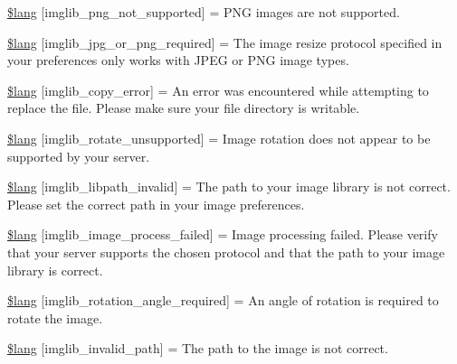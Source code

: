 \begin{DoxyCompactItemize}
\hyperlink{_admin_2system_2language_2english_2imglib__lang_8php_a0b7ea2e2fbd03eb72fe9d969adb643dd}{\$lang} \mbox{[}\textquotesingle{}imglib\+\_\+png\+\_\+not\+\_\+supported\textquotesingle{}\mbox{]} = \textquotesingle{}P\+N\+G images are not supported.\textquotesingle{}
\item 
\hyperlink{_admin_2system_2language_2english_2imglib__lang_8php_a2878e2b878871cd8010970f865d70e71}{\$lang} \mbox{[}\textquotesingle{}imglib\+\_\+jpg\+\_\+or\+\_\+png\+\_\+required\textquotesingle{}\mbox{]} = \textquotesingle{}The image resize protocol specified in your preferences only works with J\+P\+E\+G or P\+N\+G image types.\textquotesingle{}
\item 
\hyperlink{_admin_2system_2language_2english_2imglib__lang_8php_a012b6a0d2b3a8ef934e8783d2fbd6535}{\$lang} \mbox{[}\textquotesingle{}imglib\+\_\+copy\+\_\+error\textquotesingle{}\mbox{]} = \textquotesingle{}An error was encountered while attempting to replace the file. Please make sure your file directory is writable.\textquotesingle{}
\item 
\hyperlink{_admin_2system_2language_2english_2imglib__lang_8php_ab1c77c6b58fc5bf8e979ab4237ec87e7}{\$lang} \mbox{[}\textquotesingle{}imglib\+\_\+rotate\+\_\+unsupported\textquotesingle{}\mbox{]} = \textquotesingle{}Image rotation does not appear to be supported by your server.\textquotesingle{}
\item 
\hyperlink{_admin_2system_2language_2english_2imglib__lang_8php_a8f190c17a02ca89334c8bf0a04333f65}{\$lang} \mbox{[}\textquotesingle{}imglib\+\_\+libpath\+\_\+invalid\textquotesingle{}\mbox{]} = \textquotesingle{}The path to your image library is not correct. Please set the correct path in your image preferences.\textquotesingle{}
\item 
\hyperlink{_admin_2system_2language_2english_2imglib__lang_8php_a9ac6659eb97dd12e5c714cc9635cf22e}{\$lang} \mbox{[}\textquotesingle{}imglib\+\_\+image\+\_\+process\+\_\+failed\textquotesingle{}\mbox{]} = \textquotesingle{}Image processing failed. Please verify that your server supports the chosen protocol and that the path to your image library is correct.\textquotesingle{}
\item 
\hyperlink{_admin_2system_2language_2english_2imglib__lang_8php_a1110d59ea8fd0564e78068dbda3438fb}{\$lang} \mbox{[}\textquotesingle{}imglib\+\_\+rotation\+\_\+angle\+\_\+required\textquotesingle{}\mbox{]} = \textquotesingle{}An angle of rotation is required to rotate the image.\textquotesingle{}
\item 
\hyperlink{_admin_2system_2language_2english_2imglib__lang_8php_a8ff486c25806a4731d1ffe20431df825}{\$lang} \mbox{[}\textquotesingle{}imglib\+\_\+invalid\+\_\+path\textquotesingle{}\mbox{]} = \textquotesingle{}The path to the image is not correct.\textquotesingle{}

\end{DoxyCompactItemize}
